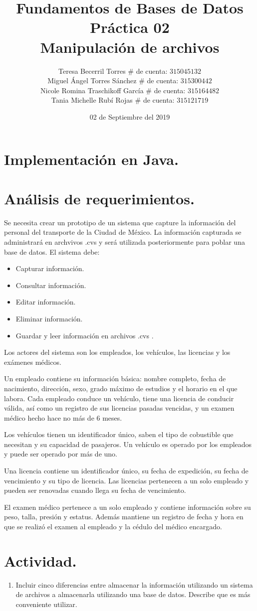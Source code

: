 \documentclass[letterpaper,12pt]{article}
\title{Fundamentos de Bases de Datos \\
        Práctica 02 \\
        Manipulación de archivos}
\author{Teresa Becerril Torres
            $\#$ de cuenta: $315045132$ \\
            Miguel Ángel Torres Sánchez
            $\#$ de cuenta: $315300442$ \\
            Nicole Romina Traschikoff García
            $\#$ de cuenta: $315164482$ \\
            Tania Michelle Rubí Rojas
            $\#$ de cuenta: $315121719$}
\date{02 de Septiembre del 2019}
\begin{document}
    \maketitle

    \section{Implementación en Java.}
    \section{Análisis de requerimientos.}
	Se necesita crear un prototipo de un sistema que capture la información del personal del transporte de la Ciudad de México. La información capturada se administrará en archvivos .cvs y será utilizada posteriormente para poblar una base de datos. El sistema debe:
	\begin{itemize}
		\item Capturar información.
		\item Consultar información.
		\item Editar información.
		\item Eliminar información.
		\item Guardar y leer información en archivos .cvs .
	\end{itemize}

	Los actores del sistema son los empleados, los vehículos, las licencias y los exámenes médicos.

	Un empleado contiene su información básica: nombre completo, fecha de nacimiento, dirección, sexo, grado máximo de estudios y el horario en el que labora. Cada empleado conduce un vehículo, tiene una licencia de conducir válida, así como un registro de sus licencias pasadas vencidas, y un examen médico hecho hace no más de 6 meses.

	Los vehículos tienen un identificador único, saben el tipo de cobustible que necesitan y su capacidad de pasajeros. Un vehículo es operado por los empleados y puede ser operado por más de uno.

	Una licencia contiene un identificador único, su fecha de expedición, su fecha de vencimiento y su tipo de licencia. Las licencias pertenecen a un solo empleado y pueden ser renovadas cuando llega su fecha de vencimiento.

	El examen médico pertenece a un solo empleado y contiene información sobre su peso, talla, presión y estatus. Además mantiene un registro de fecha y hora en que se realizó el examen al empleado y la cédulo del médico encargado.

    \section{Actividad.}
      \begin{enumerate}
        \item Incluir cinco diferencias entre almacenar la información utilizando un sistema de archivos a almacenarla utilizando una base de datos. Describe que es más conveniente utilizar.
      \end{enumerate}


            
\end{document}
